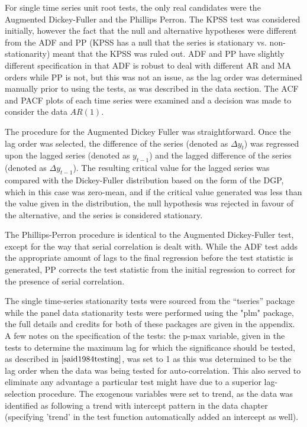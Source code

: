 For single time series unit root tests, the only real candidates were the Augmented Dickey-Fuller and the Phillips Perron. The KPSS test was considered initially, however the fact that the null and alternative hypotheses were different from the ADF and PP (KPSS has a null that the series is stationary vs. non-stationarity) meant that the KPSS was ruled out. ADF and PP have slightly different specification in that ADF is robust to deal with different AR and MA orders while PP is not, but this was not an issue, as the lag order was determined manually prior to using the tests, as was described in the data section. The ACF and PACF plots of each time series were examined and a decision was made to consider the data $AR(1)$.

The procedure for the Augmented Dickey Fuller was straightforward. Once the lag order was selected, the difference of the series (denoted as $\Delta y_t$) was regressed upon the lagged series (denoted as $y_{t-1}$) and the lagged difference of the series (denoted as $\Delta y_{t-1}$). The resulting critical value for the lagged series was compared with the Dickey-Fuller distribution based on the form of the DGP, which in this case was zero-mean, and if the critical value generated was less than the value given in the distribution, the null hypothesis was rejected in favour of the alternative, and the series is considered stationary.

The Phillips-Perron procedure is identical to the Augmented Dickey-Fuller test, except for the way that serial correlation is dealt with. While the ADF test adds the appropriate amount of lags to the final regression before the test statistic is generated, PP corrects the test statistic from the initial regression to correct for the presence of serial correlation.

The single time-series stationarity tests were sourced from the “tseries” package while the panel data stationarity tests were performed using the "plm" package, the full details and credits for both of these packages are given in the appendix. A few notes on the specification of the tests: the p-max variable, given in the tests to determine the maximum lag for which the significance should be tested, as described in $\cite{said1984testing}$, was set to 1 as this was determined to be the lag order when the data was being tested for auto-correlation. This also served to eliminate any advantage a particular test might have due to a superior lag-selection procedure. The exogenous variables were set to trend, as the data was identified as following a trend with intercept pattern in the data chapter (specifying 'trend' in the test function automatically added an intercept as well).

